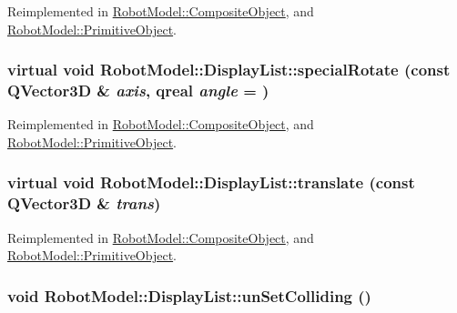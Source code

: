 Reimplemented in \hyperlink{class_robot_model_1_1_composite_object_ae925e59246174c9d3b74d459b32835e3}{RobotModel::CompositeObject}, and \hyperlink{class_robot_model_1_1_primitive_object_ae6c417003b52df18a52711031e95c44a}{RobotModel::PrimitiveObject}.\hypertarget{class_robot_model_1_1_display_list_abd15964fcf47dbfdcb06d89517871152}{
\subsubsection[{specialRotate}]{\setlength{\rightskip}{0pt plus 5cm}virtual void RobotModel::DisplayList::specialRotate (const QVector3D \& {\em axis}, \/  qreal {\em angle} = {})}}
\label{class_robot_model_1_1_display_list_abd15964fcf47dbfdcb06d89517871152}


Reimplemented in \hyperlink{class_robot_model_1_1_composite_object_ad44b9c1759209367754dafd77c984d6f}{RobotModel::CompositeObject}, and \hyperlink{class_robot_model_1_1_primitive_object_a07ece283ed8f0f0e3cdf6f36ac7b34dd}{RobotModel::PrimitiveObject}.\hypertarget{class_robot_model_1_1_display_list_a6eb574d1f9929d9e2141dbacdeeb1b6a}{
\subsubsection[{translate}]{\setlength{\rightskip}{0pt plus 5cm}virtual void RobotModel::DisplayList::translate (const QVector3D \& {\em trans})}}
\label{class_robot_model_1_1_display_list_a6eb574d1f9929d9e2141dbacdeeb1b6a}


Reimplemented in \hyperlink{class_robot_model_1_1_composite_object_afd942b7fa3b18bcc01c3fba417a6c027}{RobotModel::CompositeObject}, and \hyperlink{class_robot_model_1_1_primitive_object_ae41a1dcacd77b59c44409a77b0183a77}{RobotModel::PrimitiveObject}.\hypertarget{class_robot_model_1_1_display_list_a7440037838409ae852e02183245b338d}{
\subsubsection[{unSetColliding}]{\setlength{\rightskip}{0pt plus 5cm}void RobotModel::DisplayList::unSetColliding ()}}
\label{class_robot_model_1_1_display_list_a7440037838409ae852e02183245b338d}


